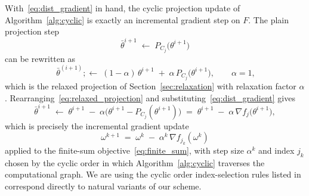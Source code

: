 \documentclass{article}
\theoremstyle{plain}
\theoremstyle{definition}
\theoremstyle{remark}
\begin{document}
With~\eqref{eq:dist_gradient} in hand, the cyclic projection update of Algorithm~\ref{alg:cyclic} is exactly an incremental gradient step on $F$. The plain projection step
\begin{equation}
    \bar \theta^{i+1} \;\gets\; P_{C_j}\!\bigl(\theta^{i+1}\bigr)
    \label{eq:plain_projection}
\end{equation}
can be rewritten as
\begin{equation} \
    \bar \theta^{(i+1)};\gets\; (1-\alpha)\,\theta^{i+1} \;+\; \alpha\, P_{C_j}\!\bigl(\theta^{i+1}\bigr),
    \qquad \alpha = 1,
    \label{eq:relaxed_projection}
\end{equation}
which is the relaxed projection of Section~\ref{sec:relaxation} with relaxation factor $\alpha$. Rearranging~\eqref{eq:relaxed_projection} and substituting~\eqref{eq:dist_gradient} gives
\begin{equation}
    \bar \theta^{i+1} \;\gets\; \theta^{i+1} \;-\; \alpha\bigl(\theta^{i+1} - P_{C_j}(\theta^{i+1})\bigr) \;=\; \theta^{i+1} \;-\; \alpha\,\nabla f_j\!\bigl(\theta^{i+1}\bigr),
    \label{eq:projection_as_gradient_step}
\end{equation}
which is precisely the incremental gradient update~\cite[Eq.~(2.78)]{bertsekas1997nonlinear}
\begin{equation}
    \omega^{k+1} \;=\; \omega^{k} \;-\; \alpha^{k}\,\nabla f_{j_k}(\omega^{k})
    \label{eq:incremental_gradient}
\end{equation}
applied to the finite-sum objective~\eqref{eq:finite_sum}, with step size $\alpha^k$ and index $j_k$ chosen by the cyclic order in which Algorithm~\ref{alg:cyclic} traverses the computational graph. We are using the cyclic order index-selection rules listed in~\cite[\S2.4.1]{bertsekas1997nonlinear} correspond directly to natural variants of our scheme.
\end{document}
